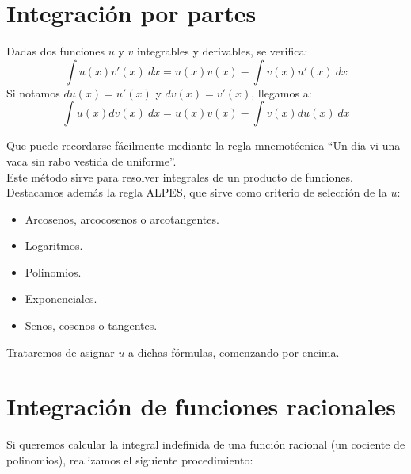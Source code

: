 \section{Integración por partes}
\begin{prop}
    Dadas dos funciones $u$ y $v$ integrables y derivables, se verifica:
    \begin{equation*}
        \displaystyle\int u(x) v'(x)~dx  = u(x)v(x) - \displaystyle\int v(x)u'(x)~dx 
    \end{equation*}
    Si notamos $du(x) = u'(x)$ y $dv(x) = v'(x)$, llegamos a:
    \begin{equation*}
        \displaystyle\int u(x)dv(x)~dx  = u(x)v(x) - \displaystyle\int v(x)du(x)~dx 
    \end{equation*}
\end{prop}
Que puede recordarse fácilmente mediante la regla mnemotécnica ``Un día vi una vaca sin rabo vestida de uniforme''.\\

\noindent
Este método sirve para resolver integrales de un producto de funciones.\\

\noindent
Destacamos además la regla ALPES\@, que sirve como criterio de selección de la $u$:
\begin{itemize}
    \item Arcosenos, arcocosenos o arcotangentes.
    \item Logaritmos.
    \item Polinomios.
    \item Exponenciales.
    \item Senos, cosenos o tangentes.
\end{itemize}
Trataremos de asignar $u$ a dichas fórmulas, comenzando por encima.

\section{Integración de funciones racionales}
Si queremos calcular la integral indefinida de una función racional (un cociente de polinomios), realizamos el siguiente procedimiento:\\

